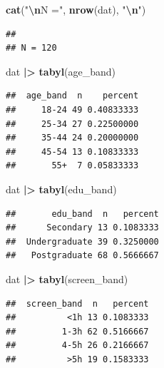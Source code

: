 \documentclass[
]{article}
\newenvironment{Shaded}{\begin{snugshade}}{\end{snugshade}}
\newcommand{\FunctionTok}[1]{\textcolor[rgb]{0.13,0.29,0.53}{\textbf{#1}}}
\newcommand{\NormalTok}[1]{#1}
\newcommand{\SpecialCharTok}[1]{\textcolor[rgb]{0.81,0.36,0.00}{\textbf{#1}}}
\newcommand{\StringTok}[1]{\textcolor[rgb]{0.31,0.60,0.02}{#1}}
\begin{document}
\begin{Shaded}
\begin{Highlighting}[]
\FunctionTok{cat}\NormalTok{(}\StringTok{"}\SpecialCharTok{\textbackslash{}n}\StringTok{N ="}\NormalTok{, }\FunctionTok{nrow}\NormalTok{(dat), }\StringTok{"}\SpecialCharTok{\textbackslash{}n}\StringTok{"}\NormalTok{)}
\end{Highlighting}
\end{Shaded}

\begin{verbatim}
## 
## N = 120
\end{verbatim}

\begin{Shaded}
\begin{Highlighting}[]
\NormalTok{dat }\SpecialCharTok{|\textgreater{}} \FunctionTok{tabyl}\NormalTok{(age\_band)}
\end{Highlighting}
\end{Shaded}

\begin{verbatim}
##  age_band  n    percent
##     18-24 49 0.40833333
##     25-34 27 0.22500000
##     35-44 24 0.20000000
##     45-54 13 0.10833333
##       55+  7 0.05833333
\end{verbatim}

\begin{Shaded}
\begin{Highlighting}[]
\NormalTok{dat }\SpecialCharTok{|\textgreater{}} \FunctionTok{tabyl}\NormalTok{(edu\_band)}
\end{Highlighting}
\end{Shaded}

\begin{verbatim}
##       edu_band  n   percent
##      Secondary 13 0.1083333
##  Undergraduate 39 0.3250000
##   Postgraduate 68 0.5666667
\end{verbatim}

\begin{Shaded}
\begin{Highlighting}[]
\NormalTok{dat }\SpecialCharTok{|\textgreater{}} \FunctionTok{tabyl}\NormalTok{(screen\_band)}
\end{Highlighting}
\end{Shaded}

\begin{verbatim}
##  screen_band  n   percent
##          <1h 13 0.1083333
##         1-3h 62 0.5166667
##         4-5h 26 0.2166667
##          >5h 19 0.1583333
\end{verbatim}
\end{document}
